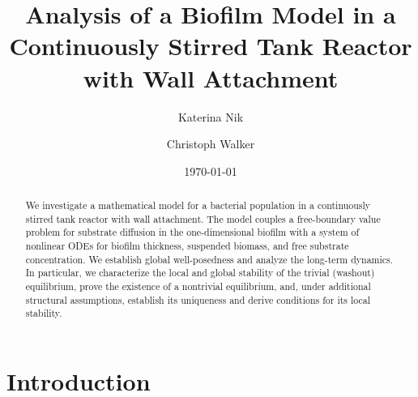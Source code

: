 \documentclass[reqno,11pt]{amsart}
\numberwithin{equation}{section}
\begin{document}

\title[A CSTR Biofilm Model]{Analysis of a Biofilm Model in a Continuously Stirred Tank Reactor with Wall Attachment}


%
\author{Katerina Nik}
\address{King Abdullah University of Science and Technology (KAUST)\\
CEMSE Division\\
Thuwal 23955-6900\\
Saudi Arabia}

\author{Christoph Walker}
\address{Leibniz Universit\"at Hannover\\
Institut f\"ur Angewandte Mathematik\\
Welfengarten 1\\
30167 Hannover\\
Germany}
%
\date{\today}

\begin{abstract}
We investigate a mathematical model for a bacterial population in a continuously stirred tank reactor with wall attachment. The model couples a free-boundary value problem for substrate diffusion in the one-dimensional biofilm
with a system of nonlinear ODEs for biofilm thickness, suspended biomass, and free substrate concentration. We establish global well-posedness and analyze the long-term dynamics. In particular, we characterize the local and global stability of the trivial (washout) equilibrium, prove the existence of a nontrivial equilibrium, and, under additional structural assumptions, establish its uniqueness and derive conditions for its local stability.
\end{abstract}
%
\maketitle
\section{Introduction}
\end{document}
